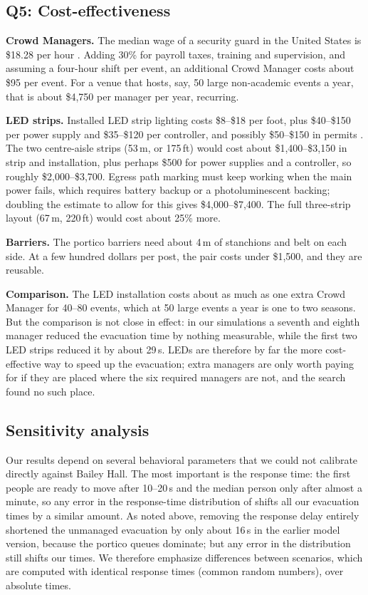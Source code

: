 \documentclass{article}
\begin{document}
\subsection{Q5: Cost-effectiveness}
\textbf{Crowd Managers.} The median wage of a security guard in the United States is \$18.28 per hour \cite{bls2025}. Adding 30\% for payroll taxes, training and supervision, and assuming a four-hour shift per event, an additional Crowd Manager costs about \$95 per event. For a venue that hosts, say, 50 large non-academic events a year, that is about \$4,750 per manager per year, recurring.

\textbf{LED strips.} Installed LED strip lighting costs \$8--\$18 per foot, plus \$40--\$150 per power supply and \$35--\$120 per controller, and possibly \$50--\$150 in permits \cite{countbricks2026}. The two centre-aisle strips (53\,m, or 175\,ft) would cost about \$1,400--\$3,150 in strip and installation, plus perhaps \$500 for power supplies and a controller, so roughly \$2,000--\$3,700. Egress path marking must keep working when the main power fails, which requires battery backup or a photoluminescent backing; doubling the estimate to allow for this gives \$4,000--\$7,400. The full three-strip layout (67\,m, 220\,ft) would cost about 25\% more.

\textbf{Barriers.} The portico barriers need about 4\,m of stanchions and belt on each side. At a few hundred dollars per post, the pair costs under \$1,500, and they are reusable.

\textbf{Comparison.} The LED installation costs about as much as one extra Crowd Manager for 40--80 events, which at 50 large events a year is one to two seasons. But the comparison is not close in effect: in our simulations a seventh and eighth manager reduced the evacuation time by nothing measurable, while the first two LED strips reduced it by about 29\,s. LEDs are therefore by far the more cost-effective way to speed up the evacuation; extra managers are only worth paying for if they are placed where the six required managers are not, and the search found no such place.

\subsection{Sensitivity analysis}
Our results depend on several behavioral parameters that we could not calibrate directly against Bailey Hall. The most important is the response time: the first people are ready to move after 10--20\,s and the median person only after almost a minute, so any error in the response-time distribution of \cite{galea2017} shifts all our evacuation times by a similar amount. As noted above, removing the response delay entirely shortened the unmanaged evacuation by only about 16\,s in the earlier model version, because the portico queues dominate; but any error in the distribution still shifts our times. We therefore emphasize differences between scenarios, which are computed with identical response times (common random numbers), over absolute times.
\end{document}
